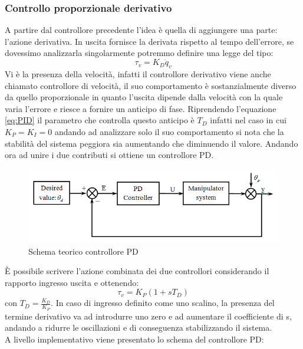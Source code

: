 \subsubsection{Controllo proporzionale derivativo}
A partire dal controllore precedente l'idea è quella di aggiungere una parte: l'azione derivativa. In uscita fornisce la derivata rispetto al tempo dell'errore, se dovessimo analizzarla singolarmente potremmo definire una legge del tipo:
\begin{equation}
\tau_v = K_D\dot{q}_v
\end{equation}
Vi è la presenza della velocità, infatti il controllore derivativo viene anche chiamato controllore di velocità, il suo comportamento è sostanzialmente diverso da quello proporzionale in quanto l'uscita dipende dalla velocità con la quale varia l'errore e riesce a fornire un anticipo di fase. Riprendendo l'equazione \ref{eq:PID} il parametro che controlla questo anticipo è $T_D$ infatti nel caso in cui $K_P=K_I=0$ andando ad analizzare solo il suo comportamento si nota che la stabilità del sistema peggiora sia aumentando che diminuendo il valore. Andando ora ad unire i due contributi si ottiene un controllore PD.
\begin{figure}[ht]
	\begin{center}
		\includegraphics[scale=0.35]{Immagini/Controllori/PDSchema}
		\caption{Schema teorico controllore PD }
		\label{fig:PDSchema}
	\end{center}
\end{figure}
È possibile scrivere l'azione combinata dei due controllori considerando il rapporto ingresso uscita e ottenendo:
\begin{equation}
\tau_v = K_P(1+sT_D)
\end{equation}
con $T_D = \frac{K_D}{K_P}$. In caso di ingresso definito come uno scalino, la presenza del termine derivativo va ad introdurre uno zero e ad aumentare il coefficiente di s, andando a ridurre le oscillazioni e di conseguenza stabilizzando il sistema.\\ A livello implementativo viene presentato lo schema del controllore PD:
